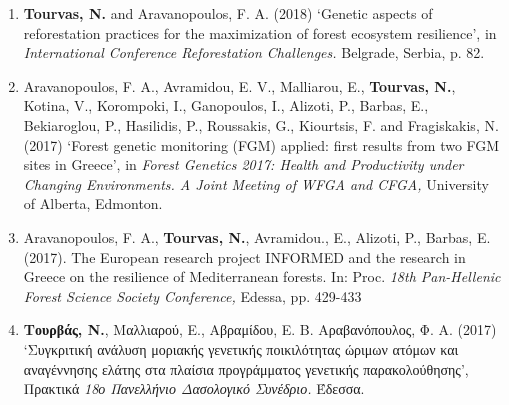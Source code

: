 \documentclass[12pt,]{scrartcl}
\begin{document}
\begin{enumerate}
\leftskip-0.07in  
\item {\textbf{Tourvas, N.} and Aravanopoulos, F. A. (2018) ‘Genetic aspects of reforestation practices for the maximization of forest ecosystem resilience’, in \textit{International Conference Reforestation Challenges.} Belgrade, Serbia, p. 82.}

\leftskip-0.07in  


\leftskip-0.07in  
\item {Aravanopoulos, F. A., Avramidou, E. V., Malliarou, E., \textbf{Tourvas, N.}, Kotina, V., Korompoki, I., Ganopoulos, I., Alizoti, P., Barbas, E., Bekiaroglou, P., Hasilidis, P., Roussakis, G., Kiourtsis, F. and Fragiskakis, N. (2017) ‘Forest genetic monitoring (FGM) applied: first results from two FGM sites in Greece’, in \textit{Forest Genetics 2017: Health and Productivity under Changing Environments. A Joint Meeting of WFGA and CFGA,} University of Alberta, Edmonton.}

\leftskip-0.07in  
\item {Aravanopoulos, F. Α., \textbf{Tourvas, N.}, Avramidou., E., Alizoti, P., Barbas, E. (2017). The European research project INFORMED and the research in Greece on the resilience of Mediterranean forests. In: Proc. \textit{18th Pan-Hellenic Forest Science Society Conference,} Edessa, pp. 429-433}
 
\leftskip-0.07in  
\item {\textbf{Τουρβάς, Ν.}, Μαλλιαρού, E., Αβραμίδου, Ε. Β. Αραβανόπουλος, Φ. Α. (2017) ‘Συγκριτική ανάλυση μοριακής γενετικής ποικιλότητας ώριμων ατόμων και αναγέννησης ελάτης στα πλαίσια προγράμματος γενετικής παρακολούθησης’, Πρακτικά \textit{18ο Πανελλήνιο Δασολογικό Συνέδριο.} Έδεσσα.}


\end{enumerate}
\end{document}
